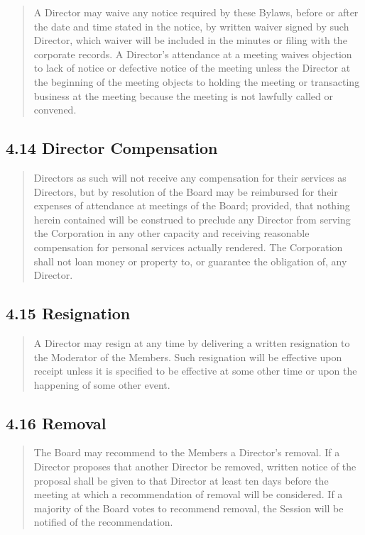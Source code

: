 \documentclass[
]{book}
\begin{document}
\begin{quote}
A Director may waive any notice required by these Bylaws, before or
after the date and time stated in the notice, by written waiver signed
by such Director, which waiver will be included in the minutes or
filing with the corporate records. A Director's attendance at a
meeting waives objection to lack of notice or defective notice of the
meeting unless the Director at the beginning of the meeting objects to
holding the meeting or transacting business at the meeting because the
meeting is not lawfully called or convened.
\end{quote}

\subsection{4.14 Director Compensation}\label{director-compensation}

\begin{quote}
Directors as such will not receive any compensation for their services
as Directors, but by resolution of the Board may be reimbursed for
their expenses of attendance at meetings of the Board; provided, that
nothing herein contained will be construed to preclude any Director
from serving the Corporation in any other capacity and receiving
reasonable compensation for personal services actually rendered. The
Corporation shall not loan money or property to, or guarantee the
obligation of, any Director.
\end{quote}

\subsection{4.15 Resignation}\label{resignation}

\begin{quote}
A Director may resign at any time by delivering a written resignation
to the Moderator of the Members. Such resignation will be effective
upon receipt unless it is specified to be effective at some other time
or upon the happening of some other event.
\end{quote}

\subsection{4.16 Removal}\label{removal}

\begin{quote}
The Board may recommend to the Members a Director's removal. If a
Director proposes that another Director be removed, written notice of
the proposal shall be given to that Director at least ten days before
the meeting at which a recommendation of removal will be considered.
If a majority of the Board votes to recommend removal, the Session
will be notified of the recommendation.
\end{quote}
\end{document}

